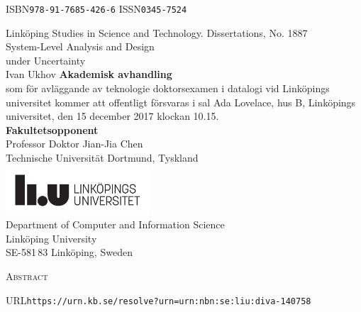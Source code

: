 \documentclass[a4paper,oneside,showtrims]{memoir}
\newcommand{\adjustlayout}{
  \setlength{\trimtop}{\stockheight}
  \addtolength{\trimtop}{-\paperheight}
  \setlength{\trimedge}{\stockwidth}
  \addtolength{\trimedge}{-\paperwidth}
  \settrims{0.5\trimtop}{0.5\trimedge}
  \setlrmargins{*}{*}{*}
  \setulmargins{2cm}{*}{*}
}
\begin{document}
  \adjustlayout
  \checkandfixthelayout
  \pagestyle{empty}
    {ISBN\hspace{0.5em}\texttt{978-91-7685-426-6}}{}
    {ISSN\hspace{0.5em}\texttt{0345-7524}}
  \thispagestyle{plain}
  \begin{center}
    {
      \small
      Linköping Studies in Science and Technology. Dissertations, No. 1887
    }\\[6em]
    {
      \headingfont
      \Huge
      System-Level Analysis and Design\\[0.2em]
      under Uncertainty
    }\\[3em]
    {
      \headingfont
      \huge
      Ivan Ukhov
    }
    \vfill
    {
      \textbf{Akademisk avhandling}\\[0.5em]
      som för avläggande av teknologie doktorsexamen i datalogi vid Linköpings
      universitet kommer att offentligt försvaras i sal Ada Lovelace, hus B,
      Linköpings universitet, den 15 december 2017 klockan 10.15.
    }\\[2em]
    {
      \textbf{Fakultetsopponent}\\[0.5em]
      Professor Doktor Jian-Jia Chen\\
      Technische Universität Dortmund, Tyskland
    }\\[2em]
    \vfill
    \includegraphics[height=5em]{include/assets/other/logo-swedish}\\[2em]
    {
      \small
      Department of Computer and Information Science\\
      Linköping University\\
      SE-581\,83 Linköping, Sweden
    }
  \end{center}
  \clearpage
  {
    \centerline{\Large\textsc{Abstract}}
    \vspace{1em}
    \noindent
    
  }
  \vfill
  \noindent
  URL\hspace{0.5em}\texttt{https://urn.kb.se/resolve?urn=urn:nbn:se:liu:diva-140758}
\end{document}
